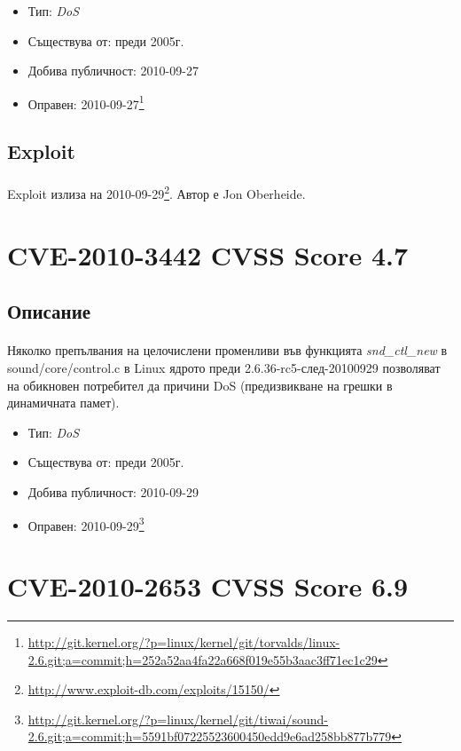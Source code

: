 \documentclass[a4paper,12pt,leqno]{article}
\begin{document}
\begin{itemize}
    \item Тип: \textit{DoS}
    \item Съществува от: преди 2005г.
  	\item Добива публичност: 2010-09-27
    \item Оправен: 2010-09-27\footnote{\url{http://git.kernel.org/?p=linux/kernel/git/torvalds/linux-2.6.git;a=commit;h=252a52aa4fa22a668f019e55b3aac3ff71ec1c29}}
\end{itemize}

\subsection{Exploit}
\paragraph{}
Exploit излиза на 2010-09-29\footnote{\url{http://www.exploit-db.com/exploits/15150/}}. Автор е Jon Oberheide.


\section{CVE-2010-3442 CVSS Score 4.7}
\subsection{Описание}
\paragraph{}
Няколко препълвания на целочислени променливи във функцията \textit{snd\_ctl\_new} в sound/core/control.c в Linux ядрото преди 2.6.36-rc5-след-20100929 позволяват на обикновен потребител да причини DoS (предизвикване на грешки в динамичната памет).

\begin{itemize}
    \item Тип: \textit{DoS}
    \item Съществува от: преди 2005г.
  	\item Добива публичност: 2010-09-29
    \item Оправен: 2010-09-29\footnote{\url{http://git.kernel.org/?p=linux/kernel/git/tiwai/sound-2.6.git;a=commit;h=5591bf07225523600450edd9e6ad258bb877b779}}
\end{itemize}

\section{CVE-2010-2653 CVSS Score 6.9}
\end{document}
